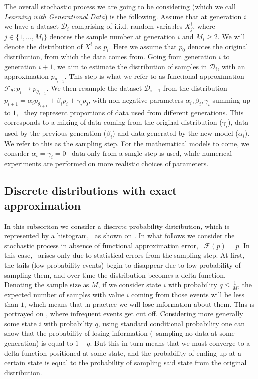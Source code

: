 The overall stochastic process we are going to be considering (which we call \textit{Learning with Generational Data}) is the following. Assume that at generation $i$ we have a dataset $\mathcal{D}_i$ comprising of i.i.d. random variables $X^i_j$, where $j \in \{1,\dots,M_i\}$ denotes the sample number at generation $i$ and $M_i\geq2$. We will denote the distribution of $X^i$ as $p_i$. Here we assume that $p_0$ denotes the original distribution, from which the data comes from. Going from generation $i$ to generation $i+1$, we aim to estimate the distribution of samples in $\mathcal{D}_i$, with an approximation $p_{\theta_{i+1}}$. This step is what we refer to as functional approximation $\mathcal{F_\theta}: p_i \to p_{\theta_{i+1}}$. We then resample the dataset $\mathcal{D}_{i+1}$ from the distribution $p_{i+1} = \alpha_i p_{\theta_{i+1}} + \beta_i p_{i} + \gamma_ip_0$, with non-negative parameters $\alpha_i, \beta_i, \gamma_i$ summing up to $1$, \ie~they represent proportions of data used from different generations. This corresponds to a mixing of data coming from the original distribution ($\gamma_i$), data used by the previous generation ($\beta_i$) and data generated by the new model ($\alpha_i$). We refer to this as the sampling step. For the mathematical models to come, we consider $\alpha_i=\gamma_i=0$ \ie~data only from a single step is used, while numerical experiments are performed on more realistic choices of parameters. 

\subsection{Discrete distributions with exact approximation}
In this subsection we consider a discrete probability distribution, which is represented by a histogram, \eg~as shown on . In what follows we consider the stochastic process in absence of functional approximation error, \ie~\;$\mathcal{F}(p)=p$. In this case, \md~arises only due to statistical errors from the sampling step. At first, the tails (low probability events) begin to disappear due to low probability of sampling them, and over time the distribution becomes a delta function. Denoting the sample size as $M$, if we consider state $i$ with probability $q\leq\frac{1}{M}$, the expected number of samples with value $i$ coming from those events will be less than $1$, which means that in practice we will lose information about them. This is portrayed on , where infrequent events get cut off. Considering more generally some state $i$ with probability $q$, using standard conditional probability one can show that the probability of losing information (\ie~sampling no data at some generation) is equal to $1-q$. But this in turn means that we must converge to a delta function positioned at some state, and the probability of ending up at a certain state is equal to the probability of sampling said state from the original distribution.

